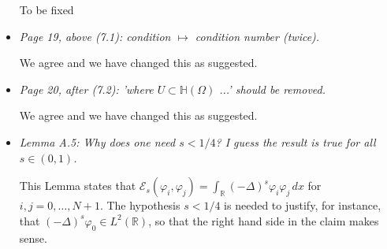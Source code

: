 \documentclass[11 pt]{article}
\numberwithin{equation}{section}
\def\r{\mathbb{R}}
\def\R{\mathbb{R}}
\def\cE{\mathcal{E}}
\begin{document}
\begin{itemize}
    {\color{red}To be fixed}

    \item \emph{Page 19, above (7.1): condition \(\mapsto\) condition number (twice).}

    We agree and we have changed this as suggested.

    \item \emph{Page 20, after (7.2): 'where \(U\subset{\mathbb{H}}(\Omega)\) ...' should be removed.}

        We agree and we have changed this as suggested.

    \item \emph{Lemma A.5: Why does one need \(s<1/4\)? I guess the result is true for all \(s\in(0,1)\).}

    This Lemma states that $\cE_s(\varphi_i,\varphi_j)=\int_{\R}(-\Delta)^s\varphi_i\varphi_j\, dx$ for $i,j=0,\ldots,N+1$.  The hypothesis $s<1/4$ is needed to justify, for instance, that $(-\Delta)^s\varphi_0\in L^2(\R)$, so that the right hand side in the claim makes sense.

%


\end{itemize}








\newpage
\end{document}
